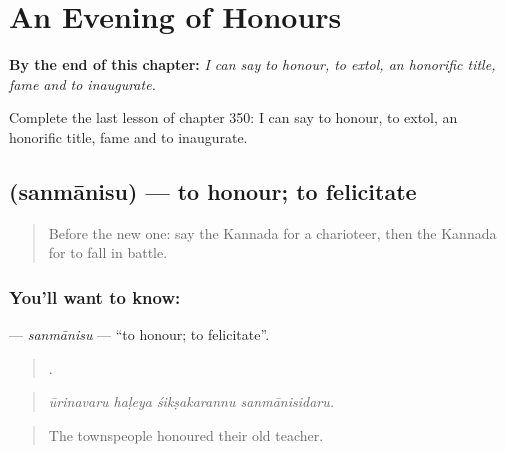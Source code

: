 
\chapter{An Evening of Honours}
\label{ch:ka-an-evening-of-honours}

\begin{chapteropening}
\textbf{By the end of this chapter:} \emph{I can say to honour, to extol, an honorific title, fame and to inaugurate.}

Complete the last lesson of chapter 350: I can say to honour, to extol, an honorific title, fame and to inaugurate.
\end{chapteropening}

\section[\texorpdfstring{\kn{ಸನ್ಮಾನಿಸು} (sanmānisu)}{ಸನ್ಮಾನಿಸು (sanmānisu)}]{ (sanmānisu) — to honour; to felicitate}

\label{lesson:KA-C350-sanmanisu}



\begin{quote}
Before the new one: say the Kannada for a charioteer, then the Kannada for to fall in battle.
\end{quote}

\subsection*{You'll want to know: }
\textbf{} — \emph{sanmānisu} — \textquotedblleft{}to honour; to felicitate\textquotedblright{}.

\begin{quote}
   .
\end{quote}

\begin{quote}
\emph{ūrinavaru haḷeya śikṣakarannu sanmānisidaru.}
\end{quote}

\begin{quote}
The townspeople honoured their old teacher.
\end{quote}

